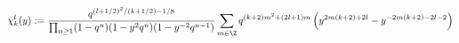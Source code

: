 \begin{equation}
  \chi_k^l(y):= {q^{(l+1/2)^2/(k+1/2)-1/8} \over \prod_{n\geq
  1}(1-q^n)(1-y^2 q^n)(1-y^{-2} q^{n-1}) } \sum_{m\in\Z}
  q^{(k+2)m^2+(2l+1)m} \left( y^{2m(k+2)+2l} - y^{-2m(k+2)-2l-2} \right) 
\end{equation}

